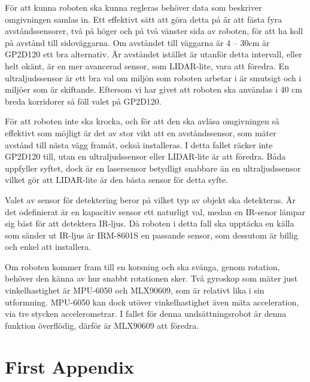 \documentclass[11pt]{article}
\begin{document}
\begin{flushleft}
För att kunna roboten ska kunna regleras behöver data som beskriver omgivningen samlas in. Ett effektivt sätt att göra detta på är att fästa fyra avståndssensorer, två på höger och på två vänster sida av roboten, för att ha koll på avstånd till sidoväggarna. Om avståndet till väggarna är 4 – 30cm är GP2D120 ett bra alternativ. Är avståndet istället är utanför detta intervall, eller helt okänt, är en mer avancerad sensor, som LIDAR-lite, vara att föredra. En ultraljudssensor är ett bra val om miljön som roboten arbetar i är smutsigt och i miljöer som är skiftande. Eftersom vi har givet att roboten ska användas i 40 cm breda korridorer så föll valet på GP2D120.

För att roboten inte ska krocka, och för att den ska avläsa omgivningen så effektivt som möjligt är det av stor vikt att en avståndssensor, som mäter avstånd till nästa vägg framåt, också installeras. I detta fallet räcker inte GP2D120 till, utan en ultraljudssensor eller LIDAR-lite är att föredra. Båda uppfyller syftet, dock är en lasersensor betydligt snabbare än en ultraljudssensor vilket gör att LIDAR-lite är den bästa sensor för detta syfte. 

Valet av sensor för detektering beror på vilket typ av objekt ska detekteras. Är det odefinierat är en kapacitiv sensor ett naturligt val, medan en IR-senor lämpar sig bäst för att detektera IR-ljus. Då roboten i detta fall ska upptäcka en källa som sänder ut IR-ljus är IRM-8601S en passande sensor, som dessutom är billig och enkel att installera.

Om roboten kommer fram till en korsning och ska svänga, genom rotation, behöver den känna av hur snabbt rotationen sker. Två gyroskop som mäter just vinkelhastighet är MPU-6050 och MLX90609, som är relativt lika i sin utformning. MPU-6050 kan dock utöver vinkelhastighet även mäta acceleration, via tre stycken accelerometrar. I fallet för denna undsättningsrobot är denna funktion överflödig, därför är MLX90609 att föredra. 


\pagebreak
{}




\pagebreak
\appendix
\section{First Appendix}

\end{flushleft}



\end{document}
